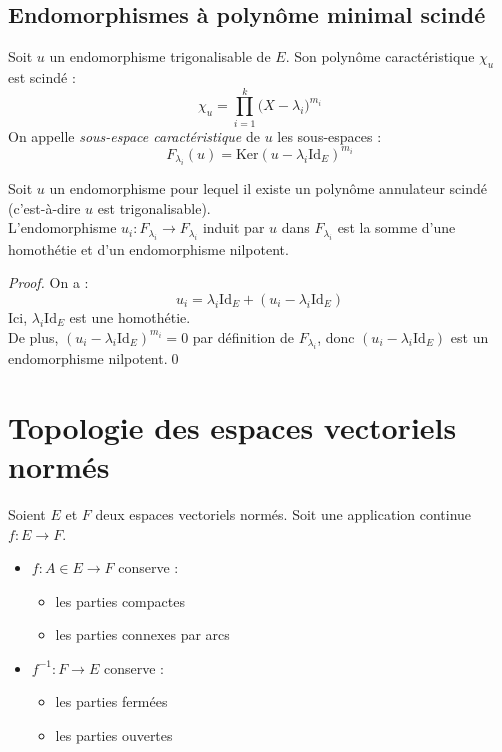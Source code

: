 \documentclass[11pt,a4paper,fleqn,pdftex]{report}
\begin{document}
\section{Endomorphismes à polynôme minimal scindé} %
\label{sec:endomorphismes_polynome_minimal_scinde}
\begin{dfn}
     Soit $u$ un endomorphisme trigonalisable de $E$. Son polynôme caractéristique $\chi_u$ est scindé : 
     \[
         \chi_u = \prod_{i=1}^k \big( X - \lambda_i \big)^{m_i}
     \]
     On appelle \emph{sous-espace caractéristique} de $u$ les sous-espaces : 
     \begin{equation}
     F_{\lambda_i}(u) = \mathrm{Ker} (u-\lambda_i \mathrm{Id}_E)^{m_i}
     \end{equation}
\end{dfn}
\begin{theorem}
     Soit $u$ un endomorphisme pour lequel il existe un polynôme annulateur scindé (c'est-à-dire $u$ est trigonalisable). \\
     L'endomorphisme $u_i : F_{\lambda_i} \to F_{\lambda_i}$ induit par $u$ dans $F_{\lambda_i}$ est la somme d'une homothétie et d'un endomorphisme nilpotent.
\end{theorem}
\begin{proof}
     On a :
     \[ u_i = \lambda_i \mathrm{Id}_E + (u_i - \lambda_i \mathrm{Id}_E) \]
     Ici, $\lambda_i \mathrm{Id}_E$ est une homothétie.\\
     De plus, $(u_i - \lambda_i \mathrm{Id}_E)^{m_i} = 0$ par définition de $F_{\lambda_i}$, donc $(u_i - \lambda_i \mathrm{Id}_E)$ est un endomorphisme nilpotent.\qed
\end{proof}
\chapter{Topologie des espaces vectoriels normés}
\begin{methode}
     Soient $E$ et $F$ deux espaces vectoriels normés. Soit une application continue $f : E \to F$.
     \begin{itemize}
         \item $f : A\in E\to F$ conserve : 
         \begin{itemize}
            \item les parties compactes
            \item les parties connexes par arcs
         \end{itemize}
         \item $f^{-1} : F \to E$ conserve :
         \begin{itemize}
             \item les parties fermées
             \item les parties ouvertes
         \end{itemize}
     \end{itemize}
\end{methode}
\end{document}
